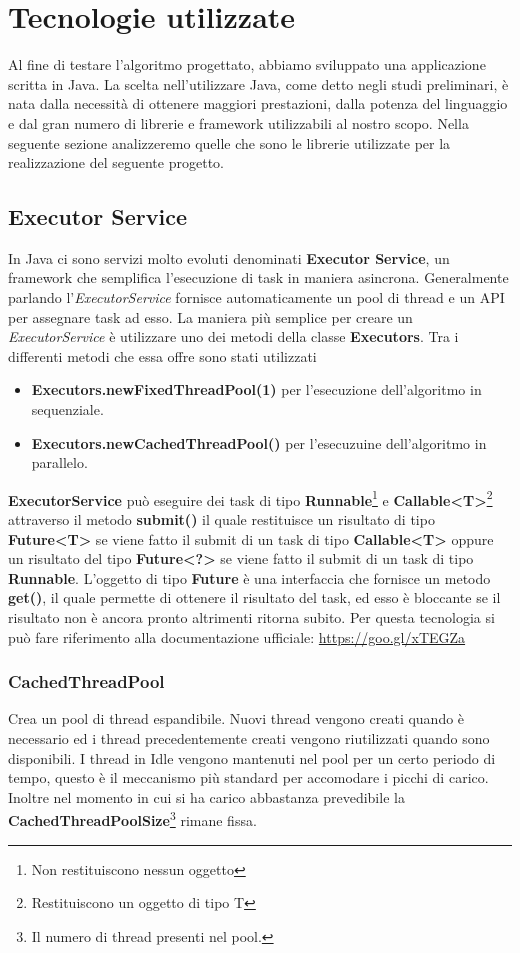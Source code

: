 \section{Tecnologie utilizzate}
Al fine di testare l'algoritmo progettato, abbiamo sviluppato una applicazione scritta in Java.
La scelta nell'utilizzare Java, come detto negli studi preliminari, è nata dalla necessità di ottenere maggiori prestazioni, dalla potenza del linguaggio e dal gran numero di librerie e framework utilizzabili al nostro scopo.
Nella seguente sezione analizzeremo quelle che sono le librerie utilizzate per la realizzazione del seguente progetto.
\subsection{Executor Service}
In Java ci sono servizi molto evoluti denominati \textbf{Executor Service}, un framework che semplifica l'esecuzione di task in maniera asincrona. Generalmente parlando l'\textit{ExecutorService} fornisce automaticamente un pool di thread e un API per assegnare task ad esso.
La maniera più semplice per creare un \textit{ExecutorService} è utilizzare uno dei metodi della classe \textbf{Executors}. Tra i differenti metodi che essa offre sono stati utilizzati
\begin{itemize}
	\item \textbf{Executors.newFixedThreadPool(1)} per l'esecuzione dell'algoritmo in sequenziale.
	\item  \textbf{Executors.newCachedThreadPool()} per l'esecuzuine dell'algoritmo in parallelo.
\end{itemize}
\textbf{ExecutorService} può eseguire dei task di tipo \textbf{Runnable}\footnote{Non restituiscono nessun oggetto} e \textbf{Callable<T>}\footnote{Restituiscono un oggetto di tipo T} attraverso il metodo \textbf{submit()} il quale restituisce un risultato di tipo\\ \textbf{Future<T>} se viene fatto il submit di un task di tipo \textbf{Callable<T>} oppure un risultato del tipo \textbf{Future<?>} se viene fatto il submit di un task di tipo \textbf{Runnable}. L'oggetto di tipo \textbf{Future} è una interfaccia che fornisce un metodo \textbf{get()}, il quale permette di ottenere il risultato del task, ed esso è bloccante se il risultato non è ancora pronto altrimenti ritorna subito.
Per questa tecnologia si può fare riferimento alla documentazione ufficiale: \url{https://goo.gl/xTEGZa}
 
\subsubsection{CachedThreadPool}
Crea un pool di thread espandibile. Nuovi thread vengono creati quando è necessario ed i thread precedentemente creati vengono riutilizzati quando sono disponibili. I thread in Idle vengono mantenuti nel pool per un certo periodo di tempo, questo è il meccanismo più standard per accomodare i picchi di carico. Inoltre nel momento in cui si ha carico abbastanza prevedibile la \textbf{CachedThreadPoolSize}\footnote{Il numero di thread presenti nel pool.} rimane fissa.
